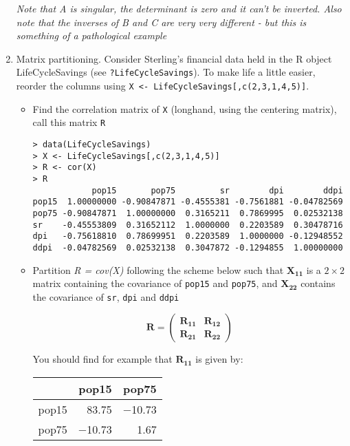 \documentclass{article}
\begin{document}
\begin{enumerate}
\textit{Note that A is singular, the determinant is zero and it can't be inverted.   Also note that the inverses of B and C are very very different - but this is something of a pathological example}


\item Matrix partitioning.   Consider Sterling's financial data held in the R object LifeCycleSavings (see \texttt{?LifeCycleSavings}).   To make life a little easier, reorder the columns using \texttt{X <- LifeCycleSavings[,c(2,3,1,4,5)]}.

\begin{itemize}
\item Find the correlation matrix of \texttt{X} (longhand, using the centering matrix), call this matrix \texttt{R}

\begin{verbatim}
> data(LifeCycleSavings)
> X <- LifeCycleSavings[,c(2,3,1,4,5)]
> R <- cor(X)
> R
            pop15       pop75         sr        dpi        ddpi
pop15  1.00000000 -0.90847871 -0.4555381 -0.7561881 -0.04782569
pop75 -0.90847871  1.00000000  0.3165211  0.7869995  0.02532138
sr    -0.45553809  0.31652112  1.0000000  0.2203589  0.30478716
dpi   -0.75618810  0.78699951  0.2203589  1.0000000 -0.12948552
ddpi  -0.04782569  0.02532138  0.3047872 -0.1294855  1.00000000
\end{verbatim}

\item Partition \textit{R = cov(X)} following the scheme below such that $\boldsymbol{X_{11}}$ is a $2 \times 2$ matrix containing the covariance of \texttt{pop15} and \texttt{pop75}, and $\boldsymbol{X_{22}}$ contains the covariance of \texttt{sr}, \texttt{dpi} and \texttt{ddpi}

\begin{displaymath}
\boldsymbol{R} = \left( \begin{array}{l|l} \boldsymbol{R_{11}} & \boldsymbol{R_{12}} \\ \hline    \boldsymbol{R_{21}} & \boldsymbol{R_{22}} \end{array} \right) 
\end{displaymath}

You should find for example that  $\boldsymbol{R_{11}}$ is given by:
\begin{table}[ht]
\begin{center}
\begin{tabular}{rrr}
\hline
 & pop15 & pop75 \\
\hline
pop15 & 83.75 & $-$10.73 \\
pop75 & $-$10.73 & 1.67 \\
\hline
\end{tabular}
\end{center}
\end{table}


\end{itemize}
\end{enumerate}
\end{document}
